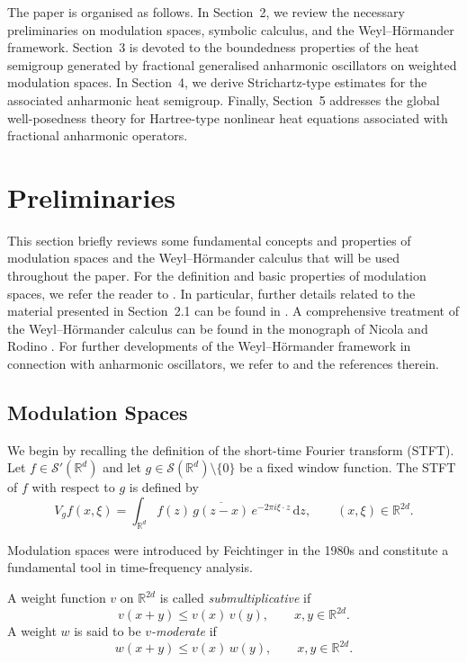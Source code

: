 \documentclass[12pt,reqno,a4paper]{amsart}
\numberwithin{equation}{section}
\theoremstyle{plain}
\theoremstyle{definition}
\theoremstyle{remark}
\begin{document}
The paper is organised as follows. In Section~2, we review the necessary preliminaries on modulation spaces, symbolic calculus, and the Weyl--H\"ormander framework. Section~3 is devoted to the boundedness properties of the heat semigroup generated by fractional generalised anharmonic oscillators on weighted modulation spaces. In Section~4, we derive Strichartz-type estimates for the associated anharmonic heat semigroup. Finally, Section~5 addresses the global well-posedness theory for Hartree-type nonlinear heat equations associated with fractional anharmonic operators.


\section{Preliminaries}
This section briefly reviews some fundamental concepts and properties of modulation spaces and the Weyl--H\"ormander calculus that will be used throughout the paper. For the definition and basic properties of modulation spaces, we refer the reader to \cite{feichtinger1983modulation, MR1843717}. In particular, further details related to the material presented in Section~2.1 can be found in \cite{dasgupta2026phase}. A comprehensive treatment of the Weyl--H\"ormander calculus can be found in the monograph of Nicola and Rodino \cite{MR2668420}. For further developments of the Weyl--H\"ormander framework in connection with anharmonic oscillators, we refer to \cite{MR4299820, MR4489248} and the references therein.

\subsection{Modulation Spaces}

We begin by recalling the definition of the short-time Fourier transform (STFT).
Let $f\in\mathcal{S}'(\mathbb{R}^d)$ and let $g\in\mathcal{S}(\mathbb{R}^d)\setminus\{0\}$
be a fixed window function. The STFT of $f$ with respect to $g$ is defined by
\[
V_g f(x,\xi)
= \int_{\mathbb{R}^d} f(z)\,\overline{g(z-x)}\,e^{-2\pi i \xi\cdot z}\,\mathrm{d}z,
\qquad (x,\xi)\in\mathbb{R}^{2d}.
\]

Modulation spaces were introduced by Feichtinger in the 1980s \cite{feichtinger1983modulation}
and constitute a fundamental tool in time-frequency analysis.

A weight function $v$ on $\mathbb{R}^{2d}$ is called \emph{submultiplicative} if
\[
v(x+y)\le v(x)\,v(y), \qquad x,y\in\mathbb{R}^{2d}.
\]
A weight $w$ is said to be \emph{$v$-moderate} if
\[
w(x+y)\le v(x)\,w(y), \qquad x,y\in\mathbb{R}^{2d}.
\]
\end{document}

